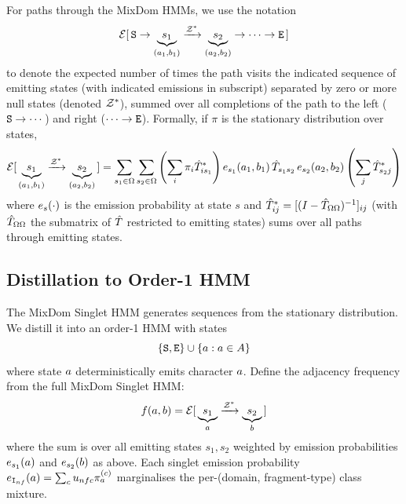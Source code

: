 For paths through the MixDom HMMs, we use the notation
\[
\mathcal{E}[\,{\tt S} \to \underbrace{s_1}_{(a_1,b_1)} \xrightarrow{\mathcal{Z}^\ast} \underbrace{s_2}_{(a_2,b_2)} \to \cdots \to {\tt E}\,]
\]
to denote the expected number of times the path visits the indicated sequence of emitting states
(with indicated emissions in subscript)
separated by zero or more null states (denoted $\mathcal{Z}^\ast$),
summed over all completions of the path to the left (${\tt S} \to \cdots$) and right ($\cdots \to {\tt E}$).
Formally, if $\pi$ is the stationary distribution over states,
\[
\mathcal{E}[\, \underbrace{s_1}_{(a_1,b_1)} \xrightarrow{\mathcal{Z}^\ast} \underbrace{s_2}_{(a_2,b_2)} \,]
= \sum_{s_1 \in \Omega} \sum_{s_2 \in \Omega}
\left( \sum_{i} \pi_i \hat{T}^\ast_{is_1} \right)
e_{s_1}(a_1,b_1)\,
\hat{T}_{s_1 s_2}\,
e_{s_2}(a_2,b_2)
\left( \sum_{j} \hat{T}^\ast_{s_2 j} \right)
\]
where $e_s(\cdot)$ is the emission probability at state $s$
and $\hat{T}^\ast_{ij} = [(I - \hat{T}_{\Omega\Omega})^{-1}]_{ij}$ (with $\hat{T}_{\Omega\Omega}$ the submatrix of $\hat{T}$ restricted to emitting states) sums over all paths through emitting states.


\subsection{Distillation to Order-1 HMM}
\label{sec:distill-hmm}

\label{sec:order1hmm}

The MixDom Singlet HMM generates sequences from the stationary distribution.
We distill it into an order-1 HMM with states
\[
\{{\tt S}, {\tt E}\} \cup \{ a : a \in A \}
\]
where state $a$ deterministically emits character $a$.
Define the adjacency frequency from the full MixDom Singlet HMM:
\[
f(a,b) =
\mathcal{E}[\,\underbrace{s_1}_{a} \xrightarrow{\mathcal{Z}^\ast} \underbrace{s_2}_{b}\,]
\]
where the sum is over all emitting states $s_1,s_2$ weighted by emission probabilities
$e_{s_1}(a)$ and $e_{s_2}(b)$ as above. Each
singlet emission probability $e_{{\tt I}_{nf}}(a)
= \sum_c u_{nfc} \pi^{(c)}_a$
marginalises the per-(domain, fragment-type) class mixture.

